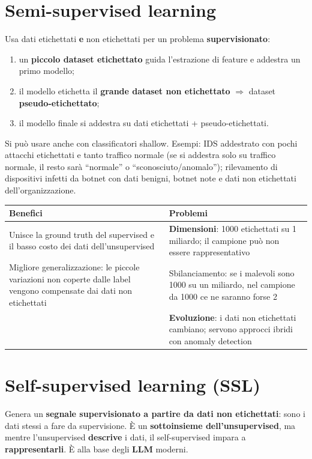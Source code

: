 \section{Semi-supervised learning}
Usa dati etichettati \textbf{e} non etichettati per un problema \textbf{supervisionato}:
\begin{enumerate}
  \item un \textbf{piccolo dataset etichettato} guida l'estrazione di feature e addestra un primo modello;
  \item il modello etichetta il \textbf{grande dataset non etichettato} $\Rightarrow$ dataset \textbf{pseudo-etichettato};
  \item il modello finale si addestra su dati etichettati + pseudo-etichettati.
\end{enumerate}
Si può usare anche con classificatori shallow. Esempi: IDS addestrato con pochi attacchi etichettati e tanto traffico
normale (se si addestra solo su traffico normale, il resto sarà ``normale'' o ``sconosciuto/anomalo''); rilevamento di
dispositivi infetti da botnet con dati benigni, botnet note e dati non etichettati dell'organizzazione.

\begin{center}
\small
\begin{tabularx}{\textwidth}{X X}
\toprule
\textbf{Benefici} & \textbf{Problemi}\\
\midrule
Unisce la ground truth del supervised e il basso costo dei dati dell'unsupervised & \textbf{Dimensioni}: 1000 etichettati su 1 miliardo; il campione può non essere rappresentativo\\
Migliore generalizzazione: le piccole variazioni non coperte dalle label vengono compensate dai dati non etichettati & Sbilanciamento: se i malevoli sono 1000 su un miliardo, nel campione da 1000 ce ne saranno forse 2\\
 & \textbf{Evoluzione}: i dati non etichettati cambiano; servono approcci ibridi con anomaly detection\\
\bottomrule
\end{tabularx}
\end{center}

\section{Self-supervised learning (SSL)}
\begin{definizione}
Genera un \textbf{segnale supervisionato a partire da dati non etichettati}: sono i dati stessi a fare da
supervisione. È un \textbf{sottoinsieme dell'unsupervised}, ma mentre l'unsupervised \textbf{descrive} i dati,
il self-supervised impara a \textbf{rappresentarli}. È alla base degli \textbf{LLM} moderni.
\end{definizione}

